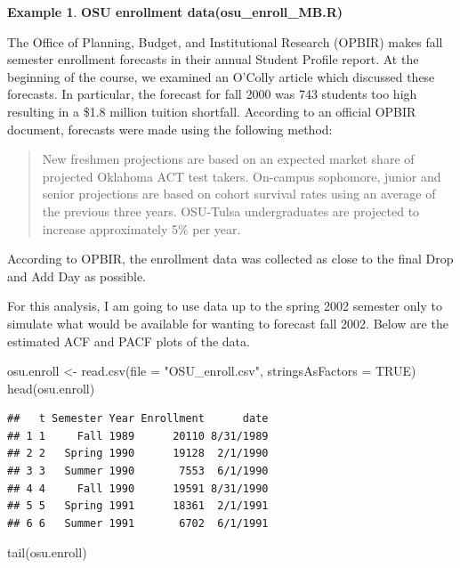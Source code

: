 \documentclass[
]{book}
\newenvironment{Shaded}{\begin{snugshade}}{\end{snugshade}}
\newcommand{\AttributeTok}[1]{\textcolor[rgb]{0.77,0.63,0.00}{#1}}
\newcommand{\ConstantTok}[1]{\textcolor[rgb]{0.00,0.00,0.00}{#1}}
\newcommand{\FunctionTok}[1]{\textcolor[rgb]{0.00,0.00,0.00}{#1}}
\newcommand{\NormalTok}[1]{#1}
\newcommand{\OtherTok}[1]{\textcolor[rgb]{0.56,0.35,0.01}{#1}}
\newcommand{\StringTok}[1]{\textcolor[rgb]{0.31,0.60,0.02}{#1}}
\theoremstyle{definition}
\theoremstyle{definition}
\newtheorem{example}{Example}[chapter]
\theoremstyle{definition}
\theoremstyle{definition}
\theoremstyle{remark}
\begin{document}
\begin{example}
\textbf{OSU enrollment data(osu\_enroll\_MB.R)}

The Office of Planning, Budget, and Institutional Research (OPBIR) makes fall semester enrollment forecasts in their annual Student Profile report. At the beginning of the course, we examined an O'Colly article which discussed these forecasts. In particular, the forecast for fall 2000 was 743 students too high resulting in a \$1.8 million tuition shortfall. According to an official OPBIR document, forecasts were made using the following method:

\begin{quote}
New freshmen projections are based on an expected market share of projected Oklahoma ACT test takers. On-campus sophomore, junior and senior projections are based on cohort survival rates using an average of the previous three years. OSU-Tulsa undergraduates are projected to increase approximately 5\% per year.
\end{quote}

According to OPBIR, the enrollment data was collected as close to the final Drop and Add Day as possible.

For this analysis, I am going to use data up to the spring 2002 semester only to simulate what would be available for wanting to forecast fall 2002. Below are the estimated ACF and PACF plots of the data.

\begin{Shaded}
\begin{Highlighting}[]
\NormalTok{osu.enroll }\OtherTok{\textless{}{-}} \FunctionTok{read.csv}\NormalTok{(}\AttributeTok{file =} \StringTok{"OSU\_enroll.csv"}\NormalTok{, }\AttributeTok{stringsAsFactors =} \ConstantTok{TRUE}\NormalTok{)}
\FunctionTok{head}\NormalTok{(osu.enroll)}
\end{Highlighting}
\end{Shaded}

\begin{verbatim}
##   t Semester Year Enrollment      date
## 1 1     Fall 1989      20110 8/31/1989
## 2 2   Spring 1990      19128  2/1/1990
## 3 3   Summer 1990       7553  6/1/1990
## 4 4     Fall 1990      19591 8/31/1990
## 5 5   Spring 1991      18361  2/1/1991
## 6 6   Summer 1991       6702  6/1/1991
\end{verbatim}

\begin{Shaded}
\begin{Highlighting}[]
\FunctionTok{tail}\NormalTok{(osu.enroll)}
\end{Highlighting}
\end{Shaded}


\end{example}
\end{document}
